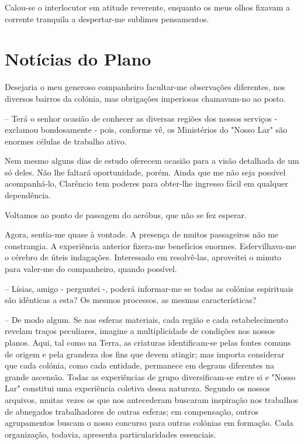 \documentclass[portuguese,12pt,a4paper]{scrbook}
\begin{document}
	Calou-se o interlocutor em atitude reverente, enquanto os meus olhos fixavam a corrente tranquila a despertar-me sublimes pensamentos.
	
	
	\chapter{Notícias do Plano}
	
	Desejaria o meu generoso companheiro facultar-me observações diferentes, nos diversos bairros da colónia, mas obrigações imperiosas chamavam-no ao posto.
	
	– Terá o senhor ocasião de conhecer as diversas regiões dos nossos serviços - exclamou bondosamente - pois, conforme vê, os Ministérios do "Nosso Lar" são enormes células de trabalho ativo.
	
	Nem mesmo alguns dias de estudo oferecem ocasião para a visão detalhada de um só deles. Não lhe faltará oportunidade, porém. Ainda que me não seja possível acompanhá-lo, Clarêncio tem poderes para obter-lhe ingresso fácil em qualquer dependência.
	
	Voltamos ao ponto de passagem do aeróbus, que não se fez esperar.
	
	Agora, sentia-me quase à vontade. A presença de muitos passageiros não me constrangia. A experiência anterior fizera-me benefícios enormes. Esfervilhava-me o cérebro de úteis indagações. Interessado em resolvê-las, aproveitei o minuto para valer-me do companheiro, quando possível.
	
	– Lísias, amigo - perguntei -, poderá informar-me se todas as colónias espirituais são idênticas a esta? Os mesmos processos, as mesmas características?
	
	– De modo algum. Se nas esferas materiais, cada região e cada estabelecimento revelam traços peculiares, imagine a multiplicidade de condições nos nossos planos. Aqui, tal como na Terra, as criaturas identificam-se pelas fontes comuns de origem e pela grandeza dos fins que devem atingir; mas importa considerar que cada colónia, como cada entidade, permanece em degraus diferentes na grande ascensão. Todas as experiências de grupo diversificam-se entre si e "Nosso Lar" constitui uma experiência coletiva dessa natureza. Segundo os nossos arquivos, muitas vezes os que nos antecederam buscaram inspiração nos trabalhos de abnegados trabalhadores de outras esferas; em compensação, outros agrupamentos buscam o nosso concurso para outras colónias em formação. Cada organização, todavia, apresenta particularidades essenciais.
	
\end{document}
